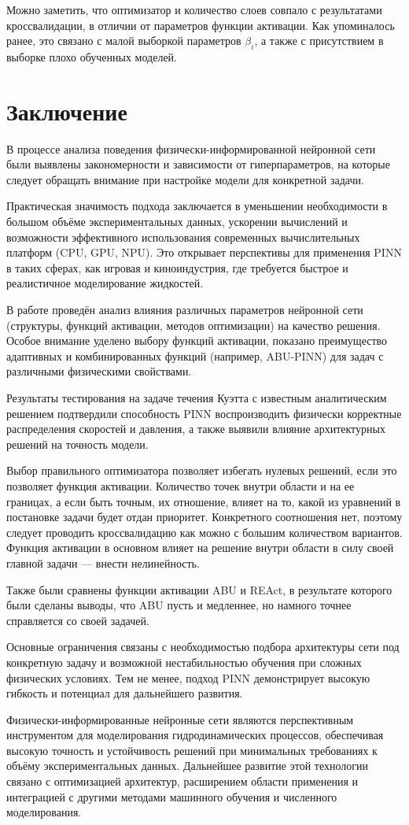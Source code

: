 Можно заметить, что оптимизатор и количество слоев совпало
с результатами кроссвалидации, в отличии от параметров
функции активации. Как упоминалось ранее, это связано с
малой выборкой параметров $\beta_i$, а также с присутствием
в выборке плохо обученных моделей. 

\chapter{Заключение}
В процессе анализа поведения физически-информированной нейронной сети были выявлены
закономерности и зависимости от гиперпараметров, на которые следует обращать внимание
при настройке модели для конкретной задачи.

Практическая значимость подхода заключается в уменьшении необходимости в большом объёме
экспериментальных данных, ускорении вычислений и возможности эффективного использования
современных вычислительных платформ (CPU, GPU, NPU). Это открывает перспективы для применения
PINN в таких сферах, как игровая и киноиндустрия, где требуется быстрое и реалистичное
моделирование жидкостей.

В работе проведён анализ влияния различных параметров нейронной сети (структуры, функций
активации, методов оптимизации) на качество решения. Особое внимание уделено выбору
функций активации, показано преимущество адаптивных и комбинированных функций (например,
ABU-PINN) для задач с различными физическими свойствами.

Результаты тестирования на задаче течения Куэтта с известным аналитическим решением подтвердили
способность PINN воспроизводить физически корректные распределения скоростей и давления,
а также выявили влияние архитектурных решений на точность модели.

Выбор правильного оптимизатора позволяет избегать нулевых решений, если это позволяет
функция активации. Количество точек внутри области и на ее границах, а если быть точным,
их отношение, влияет на то, какой из уравнений в постановке задачи будет отдан приоритет.
Конкретного соотношения нет, поэтому следует проводить кроссвалидацию как можно с большим
количеством вариантов. Функция активации в основном влияет на решение внутри области в
силу своей главной задачи --- внести нелинейность. 

Также были сравнены функции активации ABU и REAct, в результате которого были сделаны выводы,
что ABU пусть и медленнее, но намного точнее справляется со своей задачей.

Основные ограничения связаны с необходимостью подбора архитектуры сети под конкретную задачу
и возможной нестабильностью обучения при сложных физических условиях. Тем не менее, подход PINN
демонстрирует высокую гибкость и потенциал для дальнейшего развития.

Физически-информированные нейронные сети являются перспективным инструментом для моделирования
гидродинамических процессов, обеспечивая высокую точность и устойчивость решений при минимальных
требованиях к объёму экспериментальных данных. Дальнейшее развитие этой технологии связано с
оптимизацией архитектур, расширением области применения и интеграцией с другими методами машинного
обучения и численного моделирования.